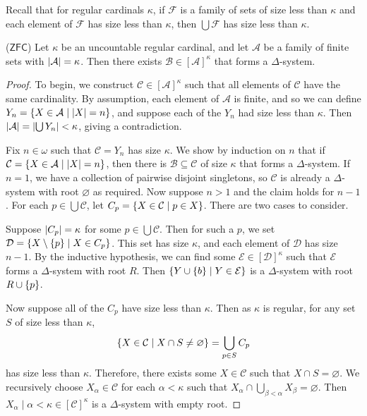 Recall that for regular cardinals \( \kappa \), if \( \mathcal F \) is a family of sets of size less than \( \kappa \) and each element of \( \mathcal F \) has size less than \( \kappa \), then \( \bigcup \mathcal F \) has size less than \( \kappa \).
\begin{lemma}
    (\( \mathsf{ZFC} \))
    Let \( \kappa \) be an uncountable regular cardinal, and let \( \mathcal A \) be a family of finite sets with \( \abs{\mathcal A} = \kappa \).
    Then there exists \( \mathcal B \in [\mathcal A]^\kappa \) that forms a \( \Delta \)-system.
\end{lemma}
\begin{proof}
    To begin, we construct \( \mathcal C \in [\mathcal A]^\kappa \) such that all elements of \( \mathcal C \) have the same cardinality.
    By assumption, each element of \( \mathcal A \) is finite, and so we can define \( Y_n = \qty{X \in \mathcal A \mid \abs{X} = n} \), and suppose each of the \( Y_n \) had size less than \( \kappa \).
    Then \( \abs{\mathcal A} = \abs{\bigcup Y_n} < \kappa \), giving a contradiction.

    Fix \( n \in \omega \) such that \( \mathcal C = Y_n \) has size \( \kappa \).
    We show by induction on \( n \) that if \( \mathcal C = \qty{X \in \mathcal A \mid \abs{X} = n} \), then there is \( \mathcal B \subseteq \mathcal C \) of size \( \kappa \) that forms a \( \Delta \)-system.
    If \( n = 1 \), we have a collection of pairwise disjoint singletons, so \( \mathcal C \) is already a \( \Delta \)-system with root \( \varnothing \) as required.
    Now suppose \( n > 1 \) and the claim holds for \( n - 1 \).
    For each \( p \in \bigcup \mathcal C \), let \( C_p = \qty{X \in \mathcal C \mid p \in X} \).
    There are two cases to consider.

    Suppose \( \abs{C_p} = \kappa \) for some \( p \in \bigcup \mathcal C \).
    Then for such a \( p \), we set \( \mathcal D = \qty{X \setminus \qty{p} \mid X \in C_p} \).
    This set has size \( \kappa \), and each element of \( \mathcal D \) has size \( n - 1 \).
    By the inductive hypothesis, we can find some \( \mathcal E \in [\mathcal D]^\kappa \) such that \( \mathcal E \) forms a \( \Delta \)-system with root \( R \).
    Then \( \qty{Y \cup \qty{b} \mid Y \in \mathcal E} \) is a \( \Delta \)-system with root \( R \cup \qty{p} \).

    Now suppose all of the \( C_p \) have size less than \( \kappa \).
    Then as \( \kappa \) is regular, for any set \( S \) of size less than \( \kappa \),
    \[ \qty{X \in \mathcal C \mid X \cap S \neq \varnothing} = \bigcup_{p \in S} C_p \]
    has size less than \( \kappa \).
    Therefore, there exists some \( X \in \mathcal C \) such that \( X \cap S = \varnothing \).
    We recursively choose \( X_\alpha \in \mathcal C \) for each \( \alpha < \kappa \) such that \( X_\alpha \cap \bigcup_{\beta < \alpha} X_\beta = \varnothing \).
    Then \( {X_\alpha \mid \alpha < \kappa} \in [\mathcal C]^\kappa \) is a \( \Delta \)-system with empty root.
\end{proof}
